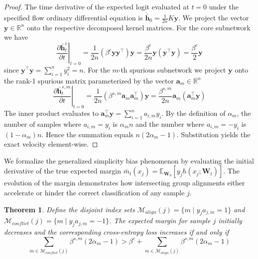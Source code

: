 \documentclass[letter,11pt]{article}
\newtheorem{theorem}{Theorem}
\begin{document}
\begin{proof}
The time derivative of the expected logit evaluated at $t=0$ under the specified flow ordinary differential equation is $\dot{\bar{\mathbf{h}}}_0 = \frac{1}{2n} K \mathbf{y}$. We project the vector $\mathbf{y} \in \mathbb{R}^n$ onto the respective decomposed kernel matrices. For the core subnetwork we have
\begin{equation}
\left. \frac{\partial \bar{\mathbf{h}}_t^c}{\partial t} \right|_{t=0} = \frac{1}{2n} (\beta^c \mathbf{y} \mathbf{y}^\top) \mathbf{y} = \frac{\beta^c}{2n} \mathbf{y} (\mathbf{y}^\top \mathbf{y}) = \frac{\beta^c}{2} \mathbf{y}
\end{equation}
since $\mathbf{y}^\top \mathbf{y} = \sum_{i=1}^n y_i^2 = n$. For the $m$-th spurious subnetwork we project $\mathbf{y}$ onto the rank-1 spurious matrix parameterized by the vector $\mathbf{a}_m \in \mathbb{R}^n$
\begin{equation}
\left. \frac{\partial \bar{\mathbf{h}}_t^{s,m}}{\partial t} \right|_{t=0} = \frac{1}{2n} (\beta^{s,m} \mathbf{a}_m \mathbf{a}_m^\top) \mathbf{y} = \frac{\beta^{s,m}}{2n} \mathbf{a}_m (\mathbf{a}_m^\top \mathbf{y})
\end{equation}
The inner product evaluates to $\mathbf{a}_m^\top \mathbf{y} = \sum_{i=1}^n a_{i,m} y_i$. By the definition of $\alpha_m$, the number of samples where $a_{i,m} = y_i$ is $\alpha_m n$ and the number where $a_{i,m} = -y_i$ is $(1-\alpha_m)n$. Hence the summation equals $n(2\alpha_m - 1)$. Substitution yields the exact velocity element-wise.
\end{proof}

We formalize the generalized simplicity bias phenomenon by evaluating the initial derivative of the true expected margin $\bar{m}_t(x_j) = \mathbb{E}_{\mathbf{W}_0}[y_j h(x_j; \mathbf{W}_t)]$. The evolution of the margin demonstrates how intersecting group alignments either accelerate or hinder the correct classification of any sample $j$.

\begin{theorem}
Define the disjoint index sets $\mathcal{M}_{align}(j) = \{m \mid y_j a_{j,m} = 1\}$ and $\mathcal{M}_{conflict}(j) = \{m \mid y_j a_{j,m} = -1\}$. The expected margin for sample $j$ initially decreases and the corresponding cross-entropy loss  increases if and only if
\begin{equation}
\sum_{m \in \mathcal{M}_{conflict}(j)} \beta^{s,m}(2\alpha_m - 1) > \beta^c + \sum_{m \in \mathcal{M}_{align}(j)} \beta^{s,m}(2\alpha_m - 1)
\end{equation}
\end{theorem}
\end{document}
